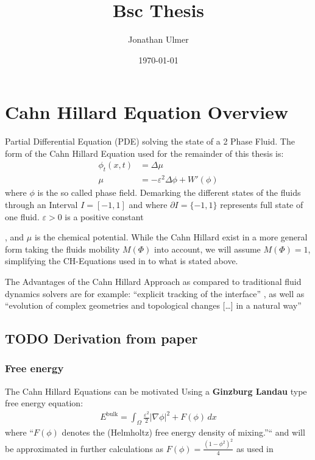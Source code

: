 \documentclass[11pt]{article}
\author{Jonathan Ulmer}
\date{\today}
\title{Bsc Thesis}
\begin{document}
\maketitle
\tableofcontents

\section{Cahn Hillard Equation Overview}
\label{sec:org8a3c2ff}
Partial Differential Equation (PDE) solving the state of a 2 Phase Fluid\autocite{Wu_2022}. The form of the Cahn Hillard Equation used for the remainder of this thesis is:
\begin{align}
\phi _t(x,t) &=  \Delta  \mu \\
\mu &= - \varepsilon^2 \Delta \phi   + W'(\phi)
\end{align}
where \(\phi\) is the so called phase field. Demarking the different states of the fluids through an Interval \(I=[-1,1]\) and where \(\partial I = \{-1,1\}\)  represents full state of one fluid. \(\varepsilon > 0\) is  a positive constant

, and \(\mu\) is the chemical potential\autocite{Wu_2022}. While the Cahn Hillard exist in a more general form taking the fluids mobility \(M(\Phi)\) into account, we will assume \(M(\Phi) = 1\), simplifying the CH-Equations used in\autocite{Wu_2022}\autocite{SHIN20117441} to what is stated above.


The Advantages of the Cahn Hillard Approach as compared to traditional fluid dynamics solvers are for example: ``explicit tracking of the interface'' \autocite{Wu_2022}, as well as ``evolution of complex geometries and topological changes [\ldots{}] in a natural way'' \autocite{Wu_2022}
\subsection{{\bfseries\sffamily TODO} Derivation from paper}
\label{sec:org52b80ab}
\subsubsection{Free energy}
\label{sec:org8bd12f1}
The Cahn Hillard Equations can be motivated Using a \textbf{Ginzburg Landau} type free energy equation:
\begin{align*}
E^{\text{bulk}}  = \int_{  \Omega}  \frac{\varepsilon^2}{2} |\nabla \phi |^2 + F(\phi) \,dx
\end{align*}
where ``\(F(\phi)\)  denotes the (Helmholtz) free energy density of mixing.''`` \autocite{Wu_2022} and will be approximated in further calculations as \(F(\phi) = \frac{(1-\phi ^2)^2}{4}\) as used in\autocite{SHIN20117441}
\end{document}

